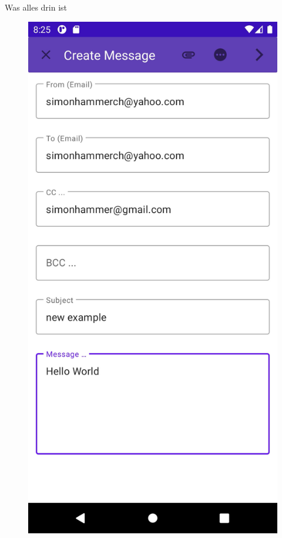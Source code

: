 \documentclass[aspectratio=169]{beamer}
\begin{document}
\begin{frame}[plain]{Was alles drin ist}
\begin{figure}[h]
        \pause
        \includegraphics[height=.8\textheight]{media/emailWriter.jpg}
        \pause

\end{figure}
\end{frame}
\end{document}
